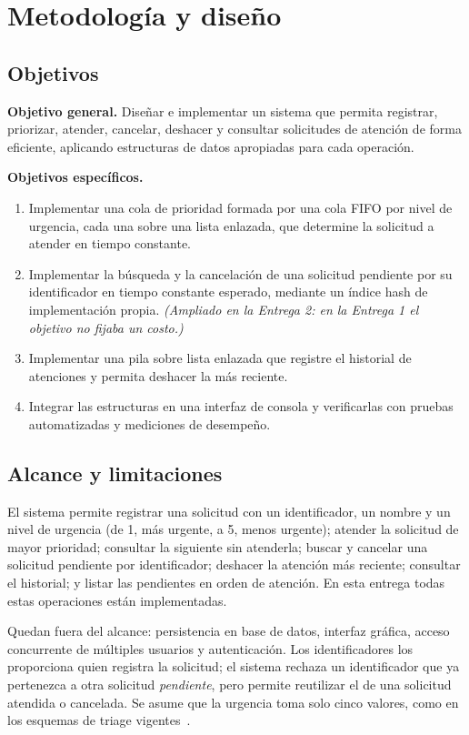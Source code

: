 \section{Metodología y diseño}
\label{sec:metodologia}

\subsection{Objetivos}

\textbf{Objetivo general.} Diseñar e implementar un sistema que permita
registrar, priorizar, atender, cancelar, deshacer y consultar solicitudes
de atención de forma eficiente, aplicando estructuras de datos apropiadas
para cada operación.

\textbf{Objetivos específicos.}
\begin{enumerate}
  \item Implementar una cola de prioridad formada por una cola FIFO por
    nivel de urgencia, cada una sobre una lista enlazada, que determine la
    solicitud a atender en tiempo constante.
  \item Implementar la búsqueda y la cancelación de una solicitud pendiente
    por su identificador en tiempo constante esperado, mediante un índice
    hash de implementación propia. \emph{(Ampliado en la Entrega 2: en la
    Entrega 1 el objetivo no fijaba un costo.)}
  \item Implementar una pila sobre lista enlazada que registre el historial
    de atenciones y permita deshacer la más reciente.
  \item Integrar las estructuras en una interfaz de consola y verificarlas
    con pruebas automatizadas y mediciones de desempeño.
\end{enumerate}

\subsection{Alcance y limitaciones}

El sistema permite registrar una solicitud con un identificador, un nombre
y un nivel de urgencia (de 1, más urgente, a 5, menos urgente); atender la
solicitud de mayor prioridad; consultar la siguiente sin atenderla; buscar
y cancelar una solicitud pendiente por identificador; deshacer la atención
más reciente; consultar el historial; y listar las pendientes en orden de
atención. En esta entrega todas estas operaciones están implementadas.

Quedan fuera del alcance: persistencia en base de datos, interfaz gráfica,
acceso concurrente de múltiples usuarios y autenticación. Los
identificadores los proporciona quien registra la solicitud; el sistema
rechaza un identificador que ya pertenezca a otra solicitud
\emph{pendiente}, pero permite reutilizar el de una solicitud atendida o
cancelada. Se asume que la urgencia toma solo cinco valores, como en los
esquemas de triage vigentes~\cite{minsalud,esi}.

